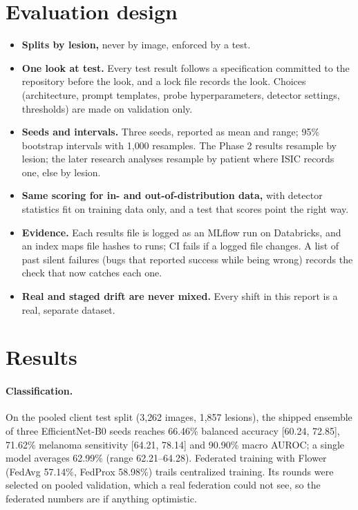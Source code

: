 \documentclass[11pt]{article}
\begin{document}
\section{Evaluation design}
\begin{itemize}
\item \textbf{Splits by lesion,} never by image, enforced by a test.
\item \textbf{One look at test.} Every test result follows a specification committed to the
repository before the look, and a lock file records the look. Choices (architecture, prompt
templates, probe hyperparameters, detector settings, thresholds) are made on validation only.
\item \textbf{Seeds and intervals.} Three seeds, reported as mean and range; 95\% bootstrap
intervals with 1{,}000 resamples. The Phase 2 results resample by lesion; the later research
analyses resample by patient where ISIC records one, else by lesion.
\item \textbf{Same scoring for in- and out-of-distribution data,} with detector statistics fit
on training data only, and a test that scores point the right way.
\item \textbf{Evidence.} Each results file is logged as an MLflow run on Databricks, and an
index maps file hashes to runs; CI fails if a logged file changes. A list of past silent
failures (bugs that reported success while being wrong) records the check that now catches
each one.
\item \textbf{Real and staged drift are never mixed.} Every shift in this report is a real,
separate dataset.
\end{itemize}

\section{Results}
\paragraph{Classification.} On the pooled client test split (3{,}262 images, 1{,}857 lesions),
the shipped ensemble of three EfficientNet-B0 seeds reaches 66.46\% balanced accuracy
[60.24, 72.85], 71.62\% melanoma sensitivity [64.21, 78.14] and 90.90\% macro AUROC; a single
model averages 62.99\% (range 62.21--64.28). Federated training with Flower \cite{beutel2020} (FedAvg \cite{mcmahan2017} 57.14\%,
FedProx \cite{li2020} 58.98\%) trails centralized training. Its rounds were selected on pooled
validation, which a real federation could not see, so the federated numbers are if anything
optimistic.
\end{document}
